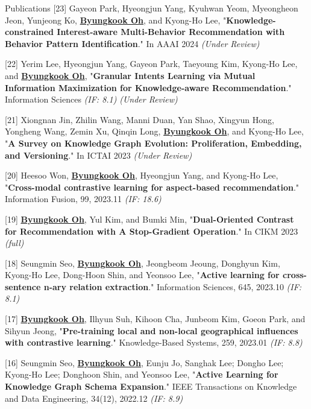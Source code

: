 \documentclass{resume} %
\newcommand{\me}[1]{\underline{\textbf{#1}}}  %
\begin{document}
	\begin{rSection}{Publications}
		[23] Gayeon Park, Hyeongjun Yang, Kyuhwan Yeom, Myeongheon Jeon, Yunjeong Ko, \me{Byungkook Oh}, and
		Kyong-Ho Lee, "\textbf{Knowledge-constrained Interest-aware Multi-Behavior Recommendation with Behavior Pattern Identification}." In AAAI 2024 \textit{(Under Review)}
		
		[22] Yerim Lee, Hyeongjun Yang, Gayeon Park, Taeyoung Kim, Kyong-Ho Lee, and \me{Byungkook Oh}, "\textbf{Granular Intents Learning via Mutual Information Maximization for Knowledge-aware Recommendation}." Information Sciences \textit{(IF: 8.1)} \textit{(Under Review)}
		
		[21] Xiongnan Jin, Zhilin Wang, Manni Duan, Yan Shao, Xingyun Hong, Yongheng Wang, Zemin Xu, Qinqin
		Long, \me{Byungkook Oh}, and Kyong-Ho Lee, "\textbf{A Survey on Knowledge Graph Evolution: Proliferation, Embedding, and Versioning}." In ICTAI 2023 \textit{(Under Review)}
		
		[20] Heesoo Won, \me{Byungkook Oh}, Hyeongjun Yang, and Kyong-Ho Lee, "\textbf{Cross-modal contrastive learning for aspect-based recommendation}." Information Fusion, 99, 2023.11 \textit{(IF: 18.6)}

		[19] \me{Byungkook Oh}, Yul Kim, and Bumki Min, "\textbf{Dual-Oriented Contrast for Recommendation with A Stop-Gradient Operation}." In CIKM 2023 \textit{(full)}
		
		[18] Seungmin Seo, \me{Byungkook Oh}, Jeongbeom Jeoung, Donghyun Kim, Kyong-Ho Lee, Dong-Hoon Shin, and
		Yeonsoo Lee, "\textbf{Active learning for cross-sentence n-ary relation extraction}." Information Sciences, 645, 2023.10 \textit{(IF: 8.1)}
		
		\newpage
		\vspace*{1em}
		
		[17] \me{Byungkook Oh}, Ilhyun Suh, Kihoon Cha, Junbeom Kim, Goeon Park, and Sihyun Jeong, "\textbf{Pre-training local and non-local geographical influences with contrastive learning}." Knowledge-Based Systems, 259, 2023.01 \textit{(IF: 8.8)}
		
		[16] Seungmin Seo, \me{Byungkook Oh}, Eunju Jo, Sanghak Lee; Dongho Lee; Kyong-Ho Lee; Donghoon Shin, and
		Yeonsoo Lee, "\textbf{Active Learning for Knowledge Graph Schema Expansion}." IEEE Transactions on Knowledge and Data Engineering, 34(12), 2022.12 \textit{(IF: 8.9)}
		

\end{rSection}
\end{document}
